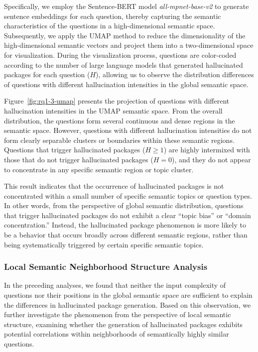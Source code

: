 Specifically, we employ the Sentence-BERT model \textit{all-mpnet-base-v2} to generate sentence embeddings for each question, thereby capturing the semantic 
characteristics of the questions in a high-dimensional semantic space. Subsequently, we apply the UMAP method to reduce the dimensionality of the high-dimensional 
semantic vectors and project them into a two-dimensional space for visualization. During the visualization process, questions are color-coded according to the 
number of large language models that generated hallucinated packages for each question ($H$), allowing us to observe the distribution differences of questions 
with different hallucination intensities in the global semantic space.

Figure~\ref{fig:rq1-3-umap} presents the projection of questions with different hallucination intensities in the UMAP semantic space. From the overall distribution, 
the questions form several continuous and dense regions in the semantic space. However, questions with different hallucination intensities do not form clearly 
separable clusters or boundaries within these semantic regions. Questions that trigger hallucinated packages ($H \geq 1$) are highly intermixed with those that 
do not trigger hallucinated packages ($H = 0$), and they do not appear to concentrate in any specific semantic region or topic cluster.

This result indicates that the occurrence of hallucinated packages is not concentrated within a small number of specific semantic topics or question types. 
In other words, from the perspective of global semantic distribution, questions that trigger hallucinated packages do not exhibit a clear “topic bias” or 
“domain concentration.” Instead, the hallucinated package phenomenon is more likely to be a behavior that occurs broadly across different semantic regions, 
rather than being systematically triggered by certain specific semantic topics.

\subsubsection{Local Semantic Neighborhood Structure Analysis}

In the preceding analyses, we found that neither the input complexity of questions nor their positions in the global semantic space are sufficient to explain 
the differences in hallucinated package generation. Based on this observation, we further investigate the phenomenon from the perspective of local semantic 
structure, examining whether the generation of hallucinated packages exhibits potential correlations within neighborhoods of semantically highly similar questions.

